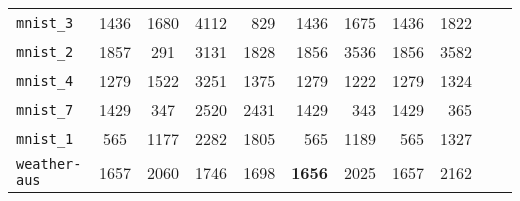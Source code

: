 \begin{tabular}{lccrrrrrrrr}
\texttt{mnist\_3} & 1436 & 1680 & 4112 & 829 & 1436 & 1675 & 1436 & 1822\\
\texttt{mnist\_2} & 1857 & 291 & 3131 & 1828 & 1856 & 3536 & 1856 & 3582\\
\texttt{mnist\_4} & 1279 & 1522 & 3251 & 1375 & 1279 & 1222 & 1279 & 1324\\
\texttt{mnist\_7} & 1429 & 347 & 2520 & 2431 & 1429 & 343 & 1429 & 365\\
\texttt{mnist\_1} & 565 & 1177 & 2282 & 1805 & 565 & 1189 & 565 & 1327\\
\texttt{weather-aus} & 1657 & 2060 & 1746 & 1698 & \textbf{1656} & 2025 & 1657 & 2162\\
\bottomrule
\end{tabular}
